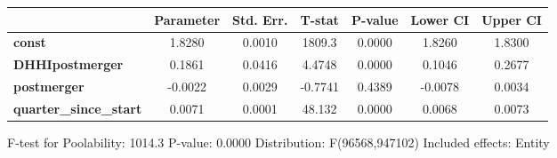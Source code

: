 \documentclass{report}
\begin{document}
\begin{center}
\begin{tabular}{lcccccc}
                               & \textbf{Parameter} & \textbf{Std. Err.} & \textbf{T-stat} & \textbf{P-value} & \textbf{Lower CI} & \textbf{Upper CI}  \\
\midrule
\textbf{const}                 &       1.8280       &       0.0010       &      1809.3     &      0.0000      &       1.8260      &       1.8300       \\
\textbf{DHHIpostmerger}        &       0.1861       &       0.0416       &      4.4748     &      0.0000      &       0.1046      &       0.2677       \\
\textbf{postmerger}            &      -0.0022       &       0.0029       &     -0.7741     &      0.4389      &      -0.0078      &       0.0034       \\
\textbf{quarter\_since\_start} &       0.0071       &       0.0001       &      48.132     &      0.0000      &       0.0068      &       0.0073       \\
\bottomrule
\end{tabular}
\end{center}

F-test for Poolability: 1014.3 \newline
 P-value: 0.0000 \newline
 Distribution: F(96568,947102) \newline
  \newline
 Included effects: Entity
\end{document}
